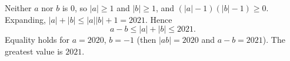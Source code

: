 Neither $a$ nor $b$ is $0$, so $|a|\ge1$ and $|b|\ge1$, and $\left(|a|-1\right)\left(|b|-1\right)\ge0$. Expanding, $|a|+|b|\le|a||b|+1=2021$. Hence
\[a-b\le|a|+|b|\le2021 .\]
Equality holds for $a=2020$, $b=-1$ (then $|ab|=2020$ and $a-b=2021$). The greatest value is $\boxed{2021}$.
